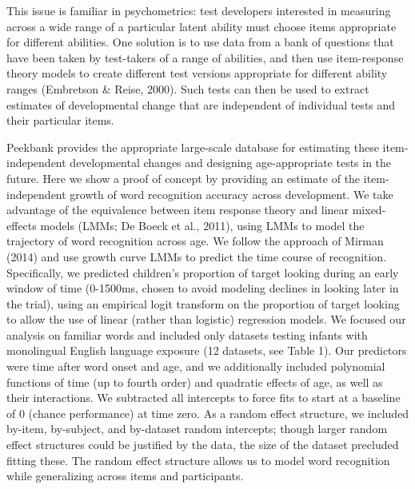 \documentclass[10pt, letterpaper]{article}
\begin{document}
This issue is familiar in psychometrics: test developers interested in
measuring across a wide range of a particular latent ability must choose
items appropriate for different abilities. One solution is to use data
from a bank of questions that have been taken by test-takers of a range
of abilities, and then use item-response theory models to create
different test versions appropriate for different ability ranges
(Embretson \& Reise, 2000). Such tests can then be used to extract
estimates of developmental change that are independent of individual
tests and their particular items.

Peekbank provides the appropriate large-scale database for estimating
these item-independent developmental changes and designing
age-appropriate tests in the future. Here we show a proof of concept by
providing an estimate of the item-independent growth of word recognition
accuracy across development. We take advantage of the equivalence
between item response theory and linear mixed-effects models (LMMs; De
Boeck et al., 2011), using LMMs to model the trajectory of word
recognition across age. We follow the approach of Mirman (2014) and use
growth curve LMMs to predict the time course of recognition.
Specifically, we predicted children's proportion of target looking
during an early window of time (0-1500ms, chosen to avoid modeling
declines in looking later in the trial), using an empirical logit
transform on the proportion of target looking to allow the use of linear
(rather than logistic) regression models. We focused our analysis on
familiar words and included only datasets testing infants with
monolingual English language exposure (12 datasets, see Table 1). Our
predictors were time after word onset and age, and we additionally
included polynomial functions of time (up to fourth order) and quadratic
effects of age, as well as their interactions. We subtracted all
intercepts to force fits to start at a baseline of 0 (chance
performance) at time zero. As a random effect structure, we included
by-item, by-subject, and by-dataset random intercepts; though larger
random effect structures could be justified by the data, the size of the
dataset precluded fitting these. The random effect structure allows us
to model word recognition while generalizing across items and
participants.
\end{document}
